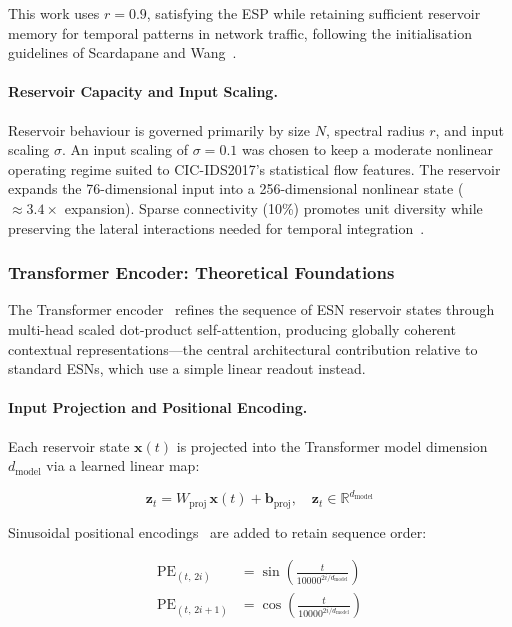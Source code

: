 \documentclass[5p,times]{elsarticle}
\begin{document}
	\noindent This work uses $r = 0.9$, satisfying the ESP while retaining
	sufficient reservoir memory for temporal patterns in network traffic,
	following the initialisation guidelines of Scardapane and
	Wang~\cite{scardapane2017}.
	
	\paragraph{Reservoir Capacity and Input Scaling.}
	Reservoir behaviour is governed primarily by size $N$, spectral radius
	$r$, and input scaling $\sigma$. An input scaling of $\sigma = 0.1$
	was chosen to keep a moderate nonlinear operating regime suited to
	CIC-IDS2017's statistical flow features. The reservoir expands the
	76-dimensional input into a 256-dimensional nonlinear state
	(${\approx}3.4\times$ expansion). Sparse connectivity (10\%) promotes
	unit diversity while preserving the lateral interactions needed for
	temporal integration~\cite{lukosevicius2012}.
	
	\subsubsection{Transformer Encoder: Theoretical Foundations}
	
	The Transformer encoder~\cite{vaswani2017attention} refines the
	sequence of ESN reservoir states through multi-head scaled
	dot-product self-attention, producing globally coherent contextual
	representations---the central architectural contribution relative to
	standard ESNs, which use a simple linear readout instead.
	
	\paragraph{Input Projection and Positional Encoding.}
	Each reservoir state $\mathbf{x}(t)$ is projected into the Transformer
	model dimension $d_{\mathrm{model}}$ via a learned linear map:
	
	\begin{equation}
		\mathbf{z}_t =
		W_{\mathrm{proj}}\,\mathbf{x}(t) + \mathbf{b}_{\mathrm{proj}},
		\quad \mathbf{z}_t \in \mathbb{R}^{d_{\mathrm{model}}}
		\label{eq:proj}
	\end{equation}
	
	Sinusoidal positional encodings~\cite{vaswani2017attention} are added
	to retain sequence order:
	
	\begin{align}
		\mathrm{PE}_{(t,\,2i)}   &=
		\sin\!\left(\frac{t}{10000^{2i/d_{\mathrm{model}}}}\right)
		\label{eq:pe_sin} \\
		\mathrm{PE}_{(t,\,2i+1)} &=
		\cos\!\left(\frac{t}{10000^{2i/d_{\mathrm{model}}}}\right)
		\label{eq:pe_cos}
	\end{align}
	
\end{document}
